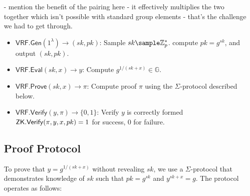 - mention the benefit of the pairing here - it effectively multiplies the two together which isn't possible with standard group elements - that's the challenge we had to get through.



\begin{itemize}
    \item $\mathsf{VRF.Gen}(1^\lambda) \to (sk, pk)$: Sample $sk \sample \mathbb{Z}_p^*$. compute $pk = g^{sk}$, and output $(sk, pk)$.
    
    \item $\mathsf{VRF.Eval}(sk, x) \to y$: Compute $g^{1/(sk + x)} \in \mathbb{G}$.
    
    \item $\mathsf{VRF.Prove}(sk, x) \to \pi$: Compute proof $\pi$ using the $\Sigma$-protocol described below.
    
    \item $\mathsf{VRF.Verify}(y, \pi) \to \{0, 1\}$: Verify $y$ is correctly formed $\mathsf{ZK.Verify}(\pi, y, x, pk) = 1$ for success, 0 for failure.
\end{itemize}


\subsection{Proof Protocol}
To prove that $y = g^{1/(sk+x)}$ without revealing $sk$, we use a $\Sigma$-protocol that demonstrates knowledge of $sk$ such that $pk = g^{sk}$ and $y^{sk+x} = g$. The protocol operates as follows:

